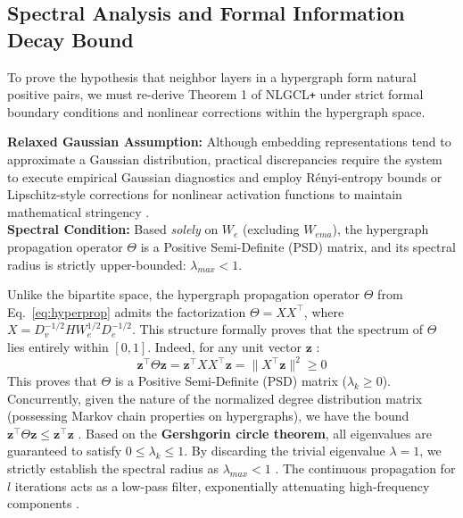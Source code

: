     \subsection{Spectral Analysis and Formal Information Decay Bound}
    
    To prove the hypothesis that neighbor layers in a hypergraph form natural positive pairs, we must re-derive Theorem 1 of NLGCL\texttt{+} under strict formal boundary conditions and nonlinear corrections within the hypergraph space.
    
    \begin{assumption}
    \label{ass:spectral}
    \textbf{Relaxed Gaussian Assumption:} Although embedding representations tend to approximate a Gaussian distribution, practical discrepancies require the system to execute empirical Gaussian diagnostics and employ R\'enyi-entropy bounds or Lipschitz-style corrections for nonlinear activation functions to maintain mathematical stringency \cite{cover2006elements, feng2025nlgcl}. \\
    \textbf{Spectral Condition:} Based \textit{solely} on $W_e$ (excluding $W_{ema}$), the hypergraph propagation operator $\Theta$ is a Positive Semi-Definite (PSD) matrix, and its spectral radius is strictly upper-bounded: $\lambda_{max} < 1$.
    \end{assumption}
    
    \begin{lemma}
    \label{lem:lowpass}
    Unlike the bipartite space, the hypergraph propagation operator $\Theta$ from Eq.~\eqref{eq:hyperprop} admits the factorization $\Theta = X X^\top$, where $X = D_v^{-1/2} H W_e^{1/2} D_e^{-1/2}$. This structure formally proves that the spectrum of $\Theta$ lies entirely within $[0, 1]$. Indeed, for any unit vector $\mathbf{z}$ \cite{wayama2023lowpassgsp, he2021hypergraphfiltering}:
    \begin{equation}
    \mathbf{z}^\top \Theta \mathbf{z} = \mathbf{z}^\top X X^\top \mathbf{z} = \|X^\top \mathbf{z}\|^2 \ge 0
    \end{equation}
    This proves that $\Theta$ is a Positive Semi-Definite (PSD) matrix ($\lambda_k \ge 0$). Concurrently, given the nature of the normalized degree distribution matrix (possessing Markov chain properties on hypergraphs), we have the bound $\mathbf{z}^\top \Theta \mathbf{z} \le \mathbf{z}^\top \mathbf{z}$ \cite{zhang2020hypergraphsignalprocessing}. Based on the \textbf{Gershgorin circle theorem}, all eigenvalues are guaranteed to satisfy $0 \le \lambda_k \le 1$. By discarding the trivial eigenvalue $\lambda = 1$, we strictly establish the spectral radius as $\lambda_{max} < 1$ \cite{zhou2006hypergraphs, chung1997spectral}. The continuous propagation for $l$ iterations acts as a low-pass filter, exponentially attenuating high-frequency components \cite{ma2025particlesystemhypergraph}.
    \end{lemma}
    
